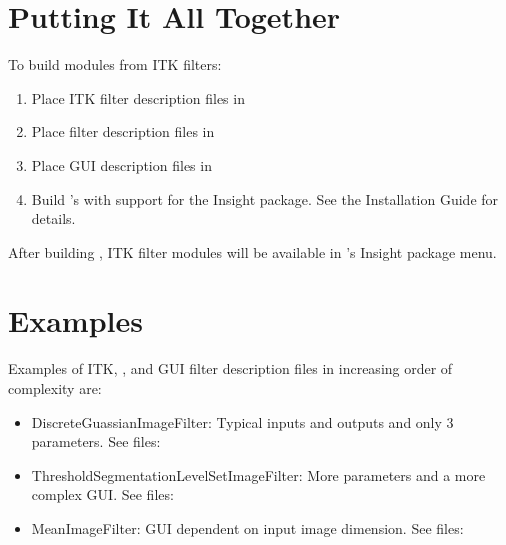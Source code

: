\section{Putting It All Together}
\label{sec:itk_mods:put_together}

To build \sr{} modules from ITK filters:

\begin{enumerate}
\item Place ITK filter description files in
\item Place \sr{} filter description files in
\item Place \sr{} GUI description files in
\item Build \sr{}'s with support for the Insight package.
  See the \sr{} Installation Guide for details.
\end{enumerate}

After building \sr{}, ITK filter modules will be available in \sr{}'s 
Insight package menu.

\section{Examples}
\label{sec:itk_mods:example}

Examples of ITK, \sr{}, and GUI filter description files in increasing
order of complexity are:

\begin{itemize}
\item DiscreteGuassianImageFilter: Typical inputs and outputs and only
  3 parameters.  See files:
  \begin{alltt}
  \end{alltt}
\item ThresholdSegmentationLevelSetImageFilter: More parameters and a
  more complex GUI.  See files:
  \begin{alltt}
  \end{alltt}
\item MeanImageFilter: GUI dependent on input image dimension.  See
  files:
  \begin{alltt}
  \end{alltt}
\end{itemize}
